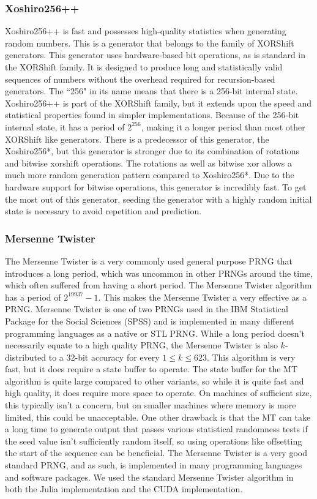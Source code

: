 \documentclass{article}
\begin{document}
            \subsubsection{Xoshiro256++}
Xoshiro256++ is fast and possesses high-quality statistics when generating random numbers. This is a generator that belongs to the family of XORShift generators. This generator uses hardware-based bit operations, as is standard in the XORShift family. It is designed to produce long and statistically valid sequences of numbers without the overhead required for recursion-based generators. The ``256" in its name means that there is a 256-bit internal state. Xoshiro256++ is part of the XORShift family, but it extends upon the speed and statistical properties found in simpler implementations. Because of the 256-bit internal state, it has a period of $2^{256}$, making it a longer period than most other XORShift like generators. There is a predecessor of this generator, the Xoshiro256*, but this generator is stronger due to its combination of rotations and bitwise xorshift operations. The rotations as well as bitwise xor allows a much more random generation pattern compared to Xoshiro256*. Due to the hardware support for bitwise operations, this generator is incredibly fast. To get the most out of this generator, seeding the generator with a highly random initial state is necessary to avoid repetition and prediction.


            \subsubsection{Mersenne Twister} 
The Mersenne Twister is a very commonly used general purpose PRNG that introduces a long period, which was uncommon in other PRNGs around the time, which often suffered from having a short period. The Mersenne Twister algorithm has a period of $2^19937-1$. This makes the Mersenne Twister a very effective as a PRNG. Mersenne Twister is one of two PRNGs used in the IBM Statistical Package for the Social Sciences (SPSS) and is implemented in many different programming languages as a native or STL PRNG. While a long period doesn't necessarily equate to a high quality PRNG, the Mersenne Twister is also $k$-distributed to a 32-bit accuracy for every $1\leq k\leq623$. This algorithm is very fast, but it does require a state buffer to operate. The state buffer for the MT algorithm is quite large compared to other variants, so while it is quite fast and high quality, it does require more space to operate. On machines of sufficient size, this typically isn't a concern, but on smaller machines where memory is more limited, this could be unacceptable. One other drawback is that the MT can take a long time to generate output that passes various statistical randomness tests if the seed value isn't sufficiently random itself, so using operations like offsetting the start of the sequence can be beneficial. The Mersenne Twister is a very good standard PRNG, and as such, is implemented in many programming languages and software packages. We used the standard Mersenne Twister algorithm in both the Julia implementation and the CUDA implementation.
\end{document}
